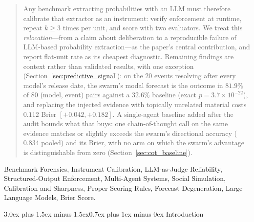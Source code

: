 \documentclass[11pt,journal,onecolumn]{IEEEtran}
\makeatletter
\renewcommand\section{\@startsection{section}{1}{\z@}%
  {3.0ex plus 1.5ex minus 1.5ex}{0.7ex plus 1ex minus 0ex}%
  {\normalfont\normalsize\centering\bfseries}}
\makeatother
\begin{document}
\begin{abstract}
Any benchmark extracting probabilities with an LLM must therefore calibrate that extractor as an instrument: verify enforcement at runtime, repeat $k \geq 3$ times per unit, and score with two evaluators. We treat this \emph{relocation}---from a claim about deliberation to a reproducible failure of LLM-based probability extraction---as the paper's central contribution, and report flat-unit rate as its cheapest diagnostic. Remaining findings are context rather than validated results, with one exception (Section~\ref{sec:predictive_signal}): on the $20$ events resolving after every model's release date, the swarm's modal forecast is the outcome in $81.9\%$ of $80$ (model, event) pairs against a $32.6\%$ baseline (exact $p = 3.7\times10^{-22}$), and replacing the injected evidence with topically unrelated material costs $0.112$ Brier $[+0.042, +0.182]$. A single-agent baseline added after the audit bounds what that buys: one chain-of-thought call on the same evidence matches or slightly exceeds the swarm's directional accuracy ($0.834$ pooled) and its Brier, with no arm on which the swarm's advantage is distinguishable from zero (Section~\ref{sec:cot_baseline}).
\end{abstract}

\begin{IEEEkeywords}
Benchmark Forensics, Instrument Calibration, LLM-as-Judge Reliability, Structured-Output Enforcement, Multi-Agent Systems, Social Simulation, Calibration and Sharpness, Proper Scoring Rules, Forecast Degeneration, Large Language Models, Brier Score.
\end{IEEEkeywords}

\section{Introduction}
\label{sec:intro}
\end{document}
